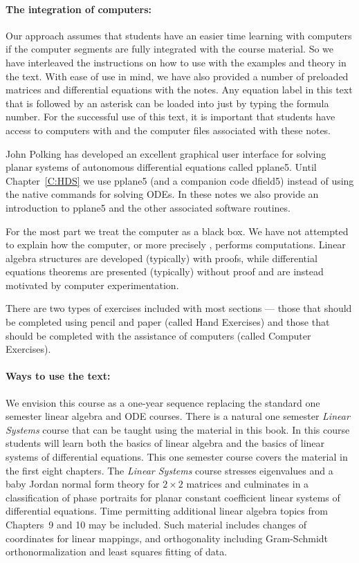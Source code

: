 \paragraph{The integration of computers:}  Our approach assumes that students 
have an easier time learning with 
computers if the computer segments are fully integrated with the course 
material.  So we have interleaved the instructions on how to use \Matlab 
with the examples and theory in the text.  With ease of use in mind, we 
have also provided a number of preloaded matrices and differential equations 
with the notes.  Any equation label in this text that is followed by an 
asterisk can be loaded into \Matlab just by typing the formula number.  For 
the successful use of this text, it is important that students have access 
to computers with \Matlab and the computer files associated with these notes.

John Polking has developed an excellent graphical user interface for solving
planar systems of autonomous differential equations called {\sf pplane5}.  
Until Chapter~\ref{C:HDS} we use {\sf pplane5} (and a companion code 
{\sf dfield5}) instead of using the \Matlab native commands for solving ODEs. 
In these notes we also provide an introduction to {\sf pplane5} and the other 
associated software routines.

For the most part we treat the computer as a black box.  We have not
attempted to explain how the computer, or more precisely \Matlabp, 
performs computations.   Linear algebra structures are developed (typically) 
with proofs, while differential equations theorems are presented (typically) 
without proof and are instead motivated by computer experimentation.  

There are two types of exercises included with most sections --- those that 
should be completed using pencil and paper (called Hand Exercises) and 
those that should be completed with the assistance of computers (called 
Computer Exercises).  

\paragraph{Ways to use the text:}  We envision this course as a one-year 
sequence replacing the standard one semester linear algebra and ODE courses. 
There is a natural one semester {\em Linear Systems\/} course that can be 
taught using the material in this book. In this course students will
learn both the basics of linear algebra and the basics of linear systems of
differential equations.  This one semester course covers the material in the 
first eight chapters.  The {\em Linear Systems\/} course stresses eigenvalues 
and a baby Jordan normal form theory for $2\times 2$ matrices and culminates 
in a classification of phase portraits for planar constant coefficient linear 
systems of differential equations.   Time permitting additional linear 
algebra topics from Chapters~9 and 10 may be included.  Such material 
includes changes of coordinates for linear mappings, and orthogonality 
including Gram-Schmidt orthonormalization and least squares fitting of data.

